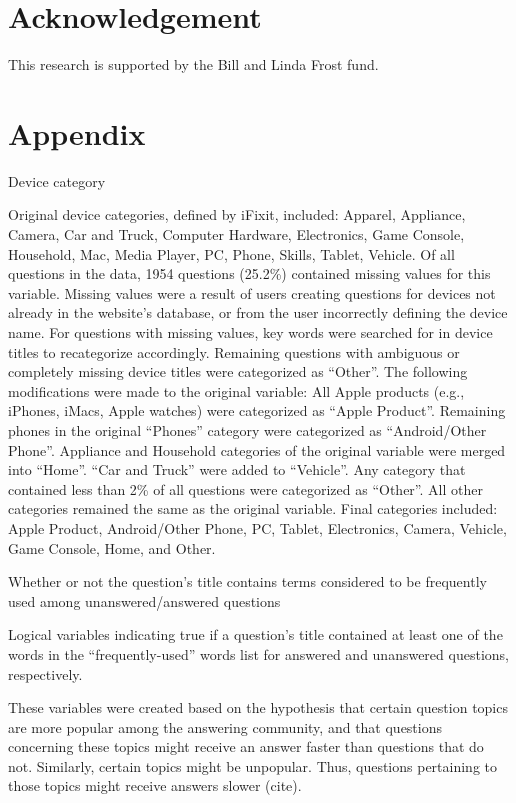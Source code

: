 \documentclass{article}
\begin{document}
\section*{Acknowledgement}

This research is supported by the Bill and Linda Frost fund. 


\section{Appendix} 

Device category 

Original device categories, defined by iFixit, included: Apparel, Appliance, Camera, Car and Truck, Computer Hardware, Electronics, Game Console, Household, Mac, Media Player, PC, Phone, Skills, Tablet, Vehicle. Of all questions in the data, 1954 questions (25.2\%) contained missing values for this variable. Missing values were a result of users creating questions for devices not already in the website's database, or from the user incorrectly defining the device name. For questions with missing values, key words were searched for in device titles to recategorize accordingly. Remaining questions with ambiguous or completely missing device titles were categorized as ``Other''. The following modifications were made to the original variable: All Apple products (e.g., iPhones, iMacs, Apple watches) were categorized as ``Apple Product''. Remaining phones in the original ``Phones'' category were categorized as ``Android/Other Phone''. Appliance and Household categories of the original variable were merged into ``Home''. ``Car and Truck'' were added to ``Vehicle''. Any category that contained less than 2\% of all questions were categorized as ``Other''. All other categories remained the same as the original variable. Final categories included: Apple Product, Android/Other Phone, PC, Tablet, Electronics, Camera, Vehicle, Game Console, Home, and Other. 

Whether or not the question's title contains terms considered to be frequently used among unanswered/answered questions

Logical variables indicating true if a question's title contained at least one of the words in the ``frequently-used'' words list for answered and unanswered questions, respectively. 

These variables were created based on the hypothesis that certain question topics are more popular among the answering community, and that questions concerning these topics might receive an answer faster than questions that do not. Similarly, certain topics might be unpopular. Thus, questions pertaining to those topics might receive answers slower (cite).
  
\end{document}
